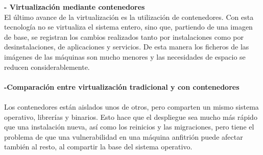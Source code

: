 \documentclass[twoside,twocolumn]{article}
\begin{document}
\begin{flushright}
\begin{itemize}
\textbf{- Virtualización mediante contenedores}\\

El último avance de la virtualización es la utilización de contenedores. Con esta tecnología no se virtualiza el sistema entero, sino que, partiendo de una imagen de base, se registran los cambios realizados tanto por instalaciones como por desinstalaciones, de aplicaciones y servicios. De esta manera los ficheros de las imágenes de las máquinas son mucho menores y las necesidades de espacio se reducen considerablemente.\textbf{}\\
\textbf{}\\
\textbf{-Comparación entre virtualización tradicional y con contenedores}\\\textbf{}\\
Los contenedores están aislados unos de otros, pero comparten un mismo sistema operativo, librerías y binarios. Esto hace que el despliegue sea mucho más rápido que una instalación nueva, así como los reinicios y las migraciones, pero tiene el problema de que una vulnerabilidad en una máquina anfitrión puede afectar también al resto, al compartir la base del sistema operativo.


\end{itemize}
\end{flushright}
\end{document}
